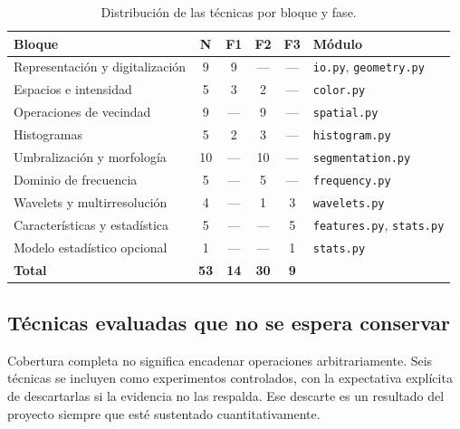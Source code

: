 \documentclass[12pt,a4paper]{article}
\begin{document}
\begin{table}[H]
\centering
\caption{Distribución de las técnicas por bloque y fase.}
\small
\begin{tabular}{@{}p{5.6cm}ccccp{3.4cm}@{}}
\toprule
\textbf{Bloque} & \textbf{N} & \textbf{F1} & \textbf{F2} & \textbf{F3} & \textbf{Módulo} \\
\midrule
Representación y digitalización & 9 & 9 & --- & --- & \texttt{io.py}, \texttt{geometry.py} \\
Espacios e intensidad & 5 & 3 & 2 & --- & \texttt{color.py} \\
Operaciones de vecindad & 9 & --- & 9 & --- & \texttt{spatial.py} \\
Histogramas & 5 & 2 & 3 & --- & \texttt{histogram.py} \\
Umbralización y morfología & 10 & --- & 10 & --- & \texttt{segmentation.py} \\
Dominio de frecuencia & 5 & --- & 5 & --- & \texttt{frequency.py} \\
Wavelets y multirresolución & 4 & --- & 1 & 3 & \texttt{wavelets.py} \\
Características y estadística & 5 & --- & --- & 5 & \texttt{features.py}, \texttt{stats.py} \\
Modelo estadístico opcional & 1 & --- & --- & 1 & \texttt{stats.py} \\
\midrule
\textbf{Total} & \textbf{53} & \textbf{14} & \textbf{30} & \textbf{9} & \\
\bottomrule
\end{tabular}
\end{table}

\subsection{Técnicas evaluadas que no se espera conservar}

Cobertura completa no significa encadenar operaciones arbitrariamente. Seis
técnicas se incluyen como experimentos controlados, con la expectativa explícita
de descartarlas si la evidencia no las respalda. Ese descarte es un resultado del
proyecto siempre que esté sustentado cuantitativamente.
\end{document}
